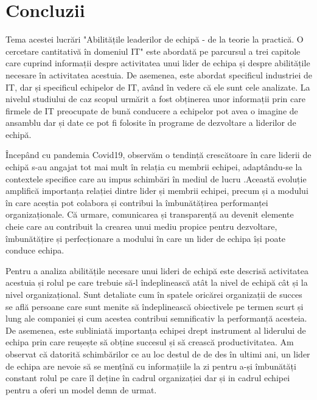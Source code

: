 \documentclass[a4paper, 12pt]{article}
\begin{document}
	\section*{Concluzii}

	\quad Tema acestei lucrări "Abilitățile leaderilor de echipă - de la teorie la practică. O cercetare cantitativă în domeniul IT" este abordată pe parcursul a trei capitole care cuprind informații despre activitatea unui lider de echipa și despre abilitățile necesare în activitatea acestuia. De asemenea, este abordat specificul industriei de IT, dar și specificul echipelor de IT, având în vedere că ele sunt cele analizate. La nivelul studiului de caz scopul urmărit a fost obținerea unor informații prin care firmele de IT preocupate de bună conducere a echipelor pot avea o imagine de ansamblu dar și date ce pot fi folosite în programe de dezvoltare a liderilor de echipă.

	\quad Începând cu pandemia Covid19, observăm o tendință crescătoare în care liderii de echipă s-au angajat tot mai mult în relația cu membrii echipei, adaptându-se la contextele specifice care au impus schimbări în mediul de lucru .Această evoluție amplifică importanța relației dintre lider și membrii echipei, precum și a modului în care aceștia pot colabora și contribui la îmbunătățirea performanței organizaționale. Că urmare, comunicarea și transparență au devenit elemente cheie care au contribuit la crearea unui mediu propice pentru dezvoltare, îmbunătățire și perfecționare a modului în care un lider de echipa își poate conduce echipa.

	\quad  Pentru a analiza abilitățile necesare unui lideri de echipă este descrisă activitatea acestuia și rolul pe care trebuie să-l îndeplinească atât la nivel de echipă cât și la nivel organizațional. Sunt detaliate cum în spatele oricărei organizații de succes se află persoane care sunt menite să îndeplinească obiectivele pe termen scurt și lung ale companiei și cum acestea contribui semnificativ la performanță acesteia. De asemenea, este subliniată importanța echipei drept instrument al liderului de echipa prin care reușește să obține succesul și să crească productivitatea. Am observat că datorită schimbărilor ce au loc destul de de des în ultimi ani, un lider de echipa are nevoie să se mențînă cu informațiile la zi pentru a-și îmbunătăți constant rolul pe care îl deține în cadrul organizației dar și in cadrul echipei pentru a oferi un model demn de urmat.
\end{document}

